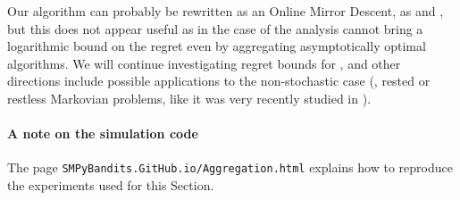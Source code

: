 Our \Aggr{} algorithm can probably be rewritten as an Online Mirror Descent, as \ExpQ{} and \CORRAL,
but this does not appear useful as in the case of \CORRAL{}  the analysis cannot bring a logarithmic bound on the regret even by aggregating asymptotically optimal algorithms.
We will continue investigating regret bounds for \Aggr,
and other directions include possible applications to the non-stochastic case (\eg, rested or restless Markovian problems, like it was very recently studied in \cite{Luo17}).

\paragraph{A note on the simulation code}
The page \texttt{SMPyBandits.GitHub.io/Aggregation.html} explains how to reproduce the experiments used for this Section.


% 
% 
